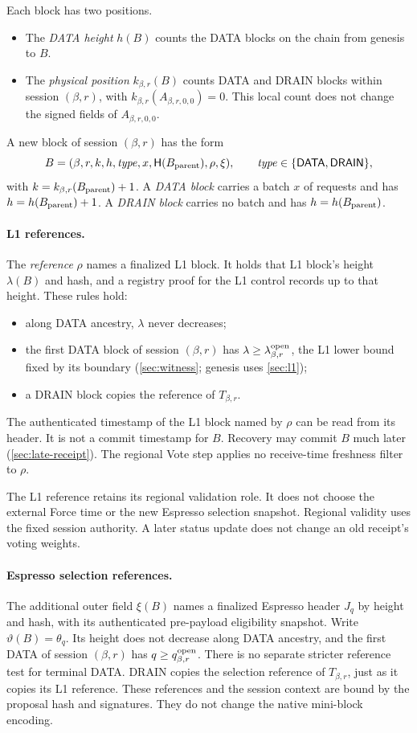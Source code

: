 \documentclass[11pt,a4paper]{article}
\newcommand{\Hash}{\mathsf H}
\newcommand{\tagg}[1]{\ensuremath{\mathsf{#1}}}
\newcommand{\defterm}[1]{\textcolor{rrBlue}{\textit{#1}}}
\begin{document}
Each block has two positions.
\begin{itemize}
\item The \defterm{DATA height} $h(B)$ counts the DATA blocks on the chain
from genesis to $B$.
\item The \defterm{physical position} $k_{\beta,r}(B)$ counts DATA and DRAIN blocks
within session $(\beta,r)$, with $k_{\beta,r}(A_{\beta,r,0,0})=0$. This local count does not change
the signed fields of $A_{\beta,r,0,0}$.
\end{itemize}
A new block of session $(\beta,r)$ has the form
\[
 B=(\beta,r,k,h,\mathit{type},x,\Hash(B_{\rm parent}),\rho,\xi),
 \qquad \mathit{type}\in\{\tagg{DATA},\tagg{DRAIN}\},
\]
with $k=k_{\beta,r}(B_{\rm parent})+1$. A \defterm{DATA block} carries a batch $x$ of
requests and has $h=h(B_{\rm parent})+1$. A \defterm{DRAIN block} carries no batch
and has $h=h(B_{\rm parent})$.

\paragraph{L1 references.}
The \defterm{reference} $\rho$ names a finalized L1 block. It holds that L1
block's height $\lambda(B)$ and hash, and a registry proof for the L1
control records up to that height. These rules hold:
\begin{itemize}
\item along DATA ancestry, $\lambda$ never decreases;
\item the first DATA block of session $(\beta,r)$ has $\lambda\ge
\lambda^{\rm open}_{\beta,r}$, the L1 lower bound fixed by its boundary
(\cref{sec:witness}; genesis uses \cref{sec:l1});
\item a DRAIN block copies the reference of $T_{\beta,r}$.
\end{itemize}
The authenticated timestamp of the L1 block named by $\rho$ can be
read from its header. It is not a commit timestamp for $B$. Recovery
may commit $B$ much later (\cref{sec:late-receipt}). The
regional Vote step applies no receive-time freshness filter to $\rho$.

The L1 reference retains its regional validation role. It does not
choose the external Force time or the new Espresso selection snapshot.
Regional validity uses the fixed session authority. A later status update
does not change an old receipt's voting weights.

\paragraph{Espresso selection references.}
The additional outer field $\xi(B)$ names a finalized Espresso header
$J_q$ by height and hash, with its authenticated pre-payload eligibility
snapshot. Write $\vartheta(B)=\theta_q$. Its height does not decrease
along DATA ancestry, and the first DATA of session $(\beta,r)$ has
$q\ge q_{\beta,r}^{\rm open}$. There is no separate stricter
reference test for terminal DATA. DRAIN copies the selection reference of $T_{\beta,r}$,
just as it copies its L1 reference. These references and the session
context are bound by the proposal hash and signatures. They do not
change the native mini-block encoding.
\end{document}
